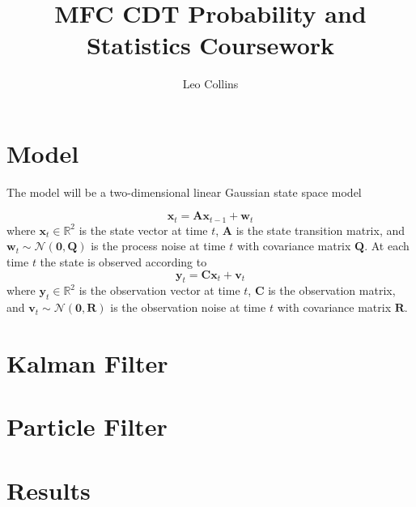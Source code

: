 \documentclass[12pt]{article}
\title{MFC CDT Probability and Statistics Coursework}
\author{Leo Collins}
\begin{document}
\maketitle

\section{Model}

The model will be a two-dimensional linear Gaussian state space model

\begin{equation}
    \mathbf{x}_{t} = \mathbf{A} \mathbf{x}_{t-1} + \mathbf{w}_{t}
\end{equation}
where $\mathbf{x}_{t} \in \mathbb{R}^{2}$ is the state vector at time $t$, $\mathbf{A}$ is the state transition matrix, and $\mathbf{w}_{t} \sim \mathcal{N}(\mathbf{0}, \mathbf{Q})$ is the process noise at time $t$ with covariance matrix $\mathbf{Q}$.
At each time $t$ the state is observed according to
\begin{equation}
    \mathbf{y}_{t} = \mathbf{C} \mathbf{x}_{t} + \mathbf{v}_{t}
\end{equation}
where $\mathbf{y}_{t} \in \mathbb{R}^{2}$ is the observation vector at time $t$, $\mathbf{C}$ is the observation matrix, and $\mathbf{v}_{t} \sim \mathcal{N}(\mathbf{0}, \mathbf{R})$ is the observation noise at time $t$ with covariance matrix $\mathbf{R}$.
\section{Kalman Filter}

\section{Particle Filter}

\section{Results}
\end{document}
